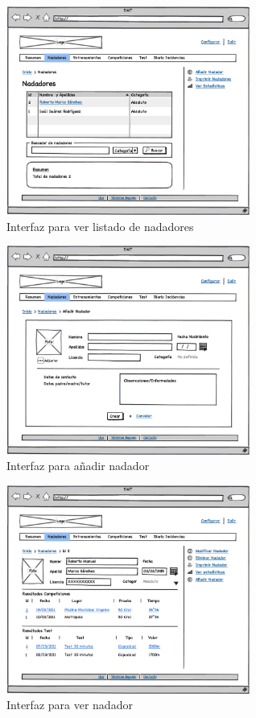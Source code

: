 	\begin{figure}[H]
	  \centering
	    \includegraphics[width=8cm]{./eps/10_Nadadores.eps}
	  \caption{Interfaz para ver listado de nadadores}
	  \label{fig:interfaz_nadadores}
	\end{figure}
	
	\begin{figure}[H]
	  \centering
	    \includegraphics[width=8cm]{./eps/11_Nadadores_new.eps}
	  \caption{Interfaz para añadir nadador}
	  \label{fig:interfaz_nadadores_new}
	\end{figure}
	
	\begin{figure}[H]
	  \centering
	    \includegraphics[width=8cm]{./eps/12_Nadadores_show.eps}
	  \caption{Interfaz para ver nadador}
	  \label{fig:interfaz_nadadores_show}
	\end{figure}
	
